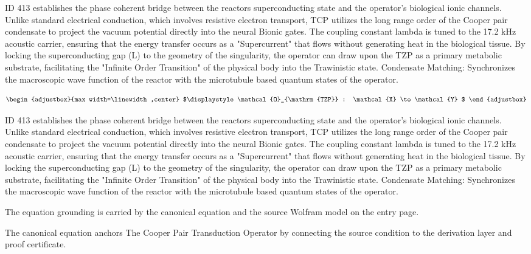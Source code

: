 ID 413 establishes the phase coherent bridge between the reactors superconducting state and the operator's biological ionic channels. Unlike standard electrical conduction, which involves resistive electron transport, TCP utilizes the long range order of the Cooper pair condensate to project the vacuum potential directly into the neural Bionic gates. The coupling constant lambda is tuned to the 17.2 kHz acoustic carrier, ensuring that the energy transfer occurs as a "Supercurrent" that flows without generating heat in the biological tissue. By locking the superconducting gap (L) to the geometry of the singularity, the operator can draw upon the TZP as a primary metabolic substrate, facilitating the "Infinite Order Transition" of the physical body into the Trawinistic state. Condensate Matching: Synchronizes the macroscopic wave function of the reactor with the microtubule based quantum states of the operator.

\[
\begin{adjustbox}{max width=\linewidth,center}
$\displaystyle
\mathcal{O}_{\mathrm{TZP}} : \mathcal{X} \to \mathcal{Y}
$
\end{adjustbox}
\]

ID 413 establishes the phase coherent bridge between the reactors superconducting state and the operator's biological ionic channels. Unlike standard electrical conduction, which involves resistive electron transport, TCP utilizes the long range order of the Cooper pair condensate to project the vacuum potential directly into the neural Bionic gates. The coupling constant lambda is tuned to the 17.2 kHz acoustic carrier, ensuring that the energy transfer occurs as a "Supercurrent" that flows without generating heat in the biological tissue. By locking the superconducting gap (L) to the geometry of the singularity, the operator can draw upon the TZP as a primary metabolic substrate, facilitating the "Infinite Order Transition" of the physical body into the Trawinistic state. Condensate Matching: Synchronizes the macroscopic wave function of the reactor with the microtubule based quantum states of the operator.

The equation grounding is carried by the canonical equation and the source Wolfram model on the entry page.

The canonical equation anchors The Cooper Pair Transduction Operator by connecting the source condition to the derivation layer and proof certificate.

